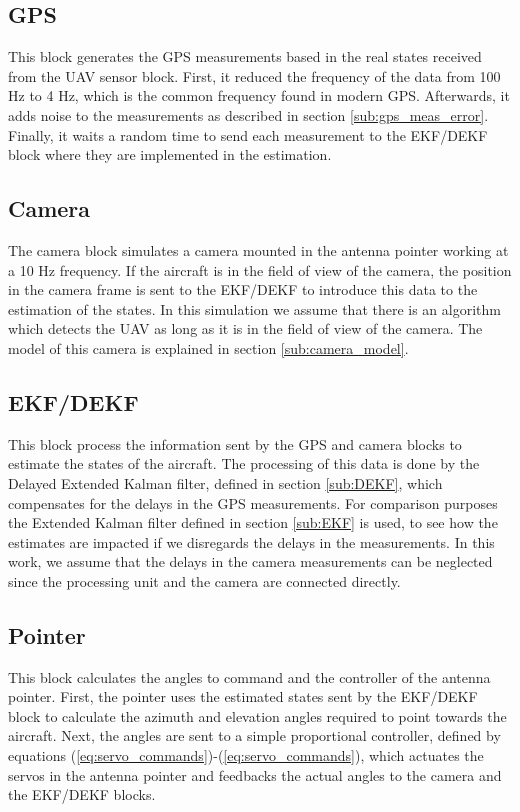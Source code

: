 \subsection{GPS}
This block generates the GPS measurements based in the real states received from the UAV sensor block. First, it reduced the frequency of the data from 100 Hz to 4 Hz, which is the common frequency found in modern GPS. Afterwards, it adds noise to the measurements as described in section \ref{sub:gps_meas_error}. Finally, it waits a random time to send each measurement to the EKF/DEKF block where they are implemented in the estimation.
\pagebreak
\subsection{Camera}
The camera block simulates a camera mounted in the antenna pointer working at a 10 Hz frequency. If the aircraft is in the field of view of the camera, the position in the camera frame is sent to the EKF/DEKF to introduce this data to the estimation of the states. In this simulation we assume that there is an algorithm which detects the UAV as long as it is in the field of view of the camera. The model of this camera is explained in section \ref{sub:camera_model}.

\subsection{EKF/DEKF}
This block process the information sent by the GPS and camera blocks to estimate the states of the aircraft. The processing of this data is done by the Delayed Extended Kalman filter, defined in section \ref{sub:DEKF}, which compensates for the delays in the GPS measurements. For comparison purposes the Extended Kalman filter defined in section \ref{sub:EKF} is used, to see how the estimates are impacted if we disregards the delays in the measurements.
In this work, we assume that the delays in the camera measurements can be neglected since the processing unit and the camera are connected directly.  

\subsection{Pointer}
This block calculates the angles to command and the controller of the antenna pointer. First, the pointer uses the estimated states sent by the EKF/DEKF block to calculate the azimuth and elevation angles required to point towards the aircraft. Next, the angles are sent to a simple proportional controller, defined by equations (\ref{eq:servo_commands})-(\ref{eq:servo_commands}), which actuates the servos in the antenna pointer and feedbacks the actual angles to the camera and the EKF/DEKF blocks. 
\pagebreak
